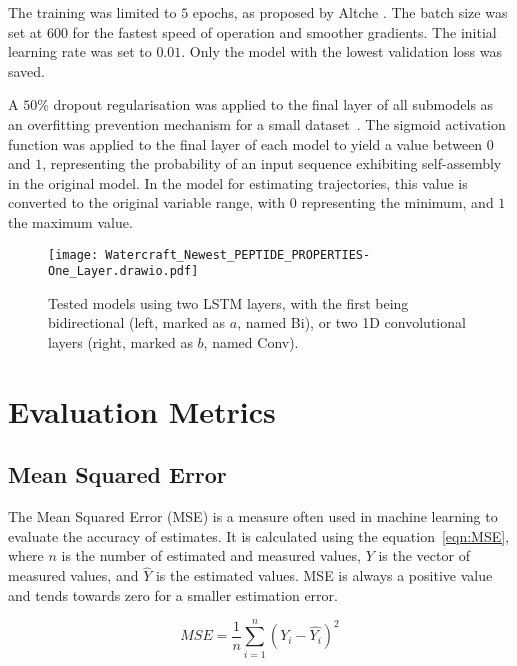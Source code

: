 \documentclass[preprint,12pt]{elsarticle}
\begin{document}
The training was limited to $5$ epochs, as proposed by Altche \cite{altche2017lstm}. The batch size was set at $600$ for the fastest speed of operation and smoother gradients. The initial learning rate was set to $0.01$. Only the model with the lowest validation loss was saved.

A $50\%$ dropout regularisation was applied to the final layer of all submodels as an overfitting prevention mechanism for a small dataset~\cite{srivastava2014dropout}. The sigmoid activation function was applied to the final layer of each model to yield a value between $0$ and $1$, representing the probability of an input sequence exhibiting self-assembly in the original model. In the model for estimating trajectories, this value is converted to the original variable range, with $0$ representing the minimum, and $1$ the maximum value.

\begin{figure}[!ht]
    \centering
    \texttt{[image: Watercraft\_Newest\_PEPTIDE\_PROPERTIES-One\_Layer.drawio.pdf]}
    \caption{Tested models using two LSTM layers, with the first being bidirectional (left, marked as $a$, named Bi), or two 1D convolutional layers (right, marked as $b$, named Conv).}
    \label{fig:ConvBi}
\end{figure}

\section{Evaluation Metrics}
\label{sec:EvaluationMetrics}

\subsection{Mean Squared Error}

The Mean Squared Error (MSE) is a measure often used in machine learning to evaluate the accuracy of estimates. It is calculated using the equation~\ref{eqn:MSE}, where $n$ is the number of estimated and measured values, $Y$ is the vector of measured values, and $\hat{Y}$ is the estimated values. MSE is always a positive value and tends towards zero for a smaller estimation error.

\begin{equation}
    MSE ={\frac{1}{n}} \sum _{i=1}^{n} \left(Y_{i}-{\hat{Y_{i}}} \right)^{2}
    \label{eqn:MSE}
\end{equation}
\end{document}
